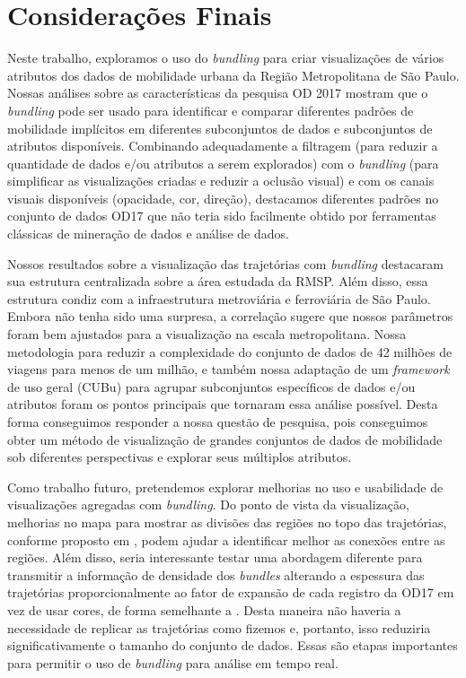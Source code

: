 \chapter{Considerações Finais}
\label{cap:plano-de-trabalho}

Neste trabalho, exploramos o uso do \emph{bundling} para criar
visualizações de vários atributos dos dados de mobilidade urbana da Região
Metropolitana de São Paulo. Nossas análises sobre as características da pesquisa
OD 2017 mostram que o \emph{bundling} pode ser usado para identificar e comparar
diferentes padrões de mobilidade implícitos em diferentes subconjuntos de dados
e subconjuntos de atributos disponíveis. Combinando adequadamente a filtragem
(para reduzir a quantidade de dados e/ou atributos a serem explorados) com o
\emph{bundling} (para simplificar as visualizações criadas e reduzir a oclusão
visual) e com os canais visuais disponíveis (opacidade, cor, direção),
destacamos diferentes padrões no conjunto de dados OD17 que não teria sido
facilmente obtido por ferramentas clássicas de mineração de dados e análise de
dados.

Nossos resultados sobre a visualização das trajetórias com \emph{bundling}
destacaram sua estrutura centralizada sobre a área estudada da RMSP. Além disso,
essa estrutura condiz com a infraestrutura metroviária e ferroviária de São
Paulo. Embora não tenha sido uma surpresa, a correlação sugere que nossos
parâmetros foram bem ajustados para a visualização na escala metropolitana.
Nossa metodologia para reduzir a complexidade do conjunto de dados de 42 milhões
de viagens para menos de um milhão, e também nossa adaptação de um
\emph{framework} de uso geral (CUBu) para agrupar subconjuntos específicos de
dados e/ou atributos foram os pontos principais que tornaram essa análise
possível. Desta forma conseguimos responder a nossa questão de pesquisa, pois
conseguimos obter um método de visualização de grandes conjuntos de dados de
mobilidade sob diferentes perspectivas e explorar seus múltiplos atributos.

Como trabalho futuro, pretendemos explorar melhorias no uso e usabilidade de
visualizações agregadas com \emph{bundling}. Do ponto de vista da visualização,
melhorias no mapa para mostrar as divisões das regiões no topo das trajetórias,
conforme proposto em \cite{Klein2014}, podem ajudar a identificar melhor as
conexões entre as regiões. Além disso, seria interessante testar uma abordagem
diferente para transmitir a informação de densidade dos \emph{bundles} alterando
a espessura das trajetórias proporcionalmente ao fator de expansão de cada
registro da OD17 em vez de usar cores, de forma semelhante a
\cite{lhuillier-fft:17}. Desta maneira não haveria a necessidade de replicar as
trajetórias como fizemos e, portanto, isso reduziria significativamente o
tamanho do conjunto de dados. Essas são etapas importantes para permitir o uso
de \emph{bundling} para análise em tempo real.

